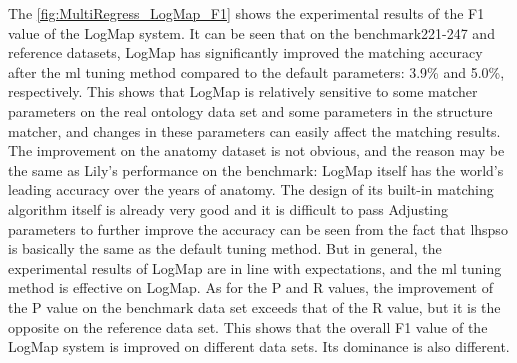 \documentclass[twoside]{article}
\begin{document}
The \ref{fig:MultiRegress_LogMap_F1} shows the experimental results of the F1 value of the LogMap system.
It can be seen that on the benchmark221-247 and reference datasets, LogMap has significantly improved the matching accuracy after the ml tuning method compared to the default parameters: 3.9\% and 5.0\%, respectively.
This shows that LogMap is relatively sensitive to some matcher parameters on the real ontology data set and some parameters in the structure matcher, and changes in these parameters can easily affect the matching results.
The improvement on the anatomy dataset is not obvious, and the reason may be the same as Lily's performance on the benchmark: LogMap itself has the world's leading accuracy over the years of anatomy. The design of its built-in matching algorithm itself is already very good and it is difficult to pass Adjusting parameters to further improve the accuracy can be seen from the fact that lhspso is basically the same as the default tuning method. But in general, the experimental results of LogMap are in line with expectations, and the ml tuning method is effective on LogMap.
As for the P and R values, the improvement of the P value on the benchmark data set exceeds that of the R value, but it is the opposite on the reference data set. This shows that the overall F1 value of the LogMap system is improved on different data sets. Its dominance is also different.
\end{document}
